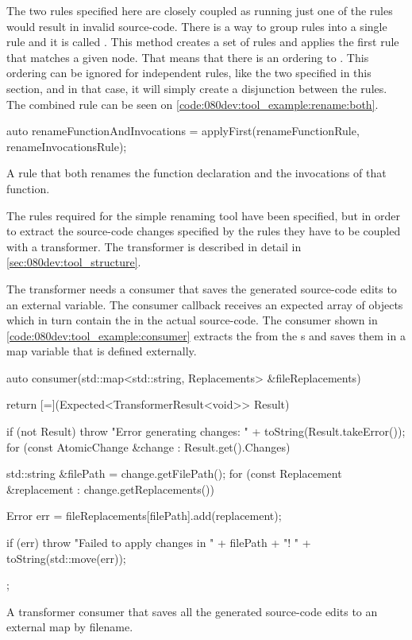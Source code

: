 The two rules specified here are closely coupled as running just one of the rules would result in invalid source-code. There is a way to group rules into a single rule and it is called . This method creates a set of rules and applies the first rule that matches a given node. That means that there is an ordering to . This ordering can be ignored for independent rules, like the two specified in this section, and in that case, it will simply create a disjunction between the rules. The combined rule can be seen on \cref{code:080dev:tool_example:rename:both}.

\begin{listing}[H]
    \begin{cppcode}
auto renameFunctionAndInvocations = applyFirst({renameFunctionRule, renameInvocationsRule});
    \end{cppcode}
    \caption{A rule that both renames the function declaration and the invocations of that function.}
    \label{code:080dev:tool_example:rename:both}
\end{listing}

The rules required for the simple renaming tool have been specified, but in order to extract the source-code changes specified by the rules they have to be coupled with a transformer. The transformer is described in detail in \cref{sec:080dev:tool_structure}.

The transformer needs a consumer that saves the generated source-code edits to an external variable. The consumer callback receives an expected array of  objects which in turn contain the  in the actual source-code. The consumer shown in \cref{code:080dev:tool_example:consumer} extracts the  from the s and saves them in a map variable that is defined externally.

\begin{listing}[H]
    \begin{cppcode}
auto consumer(std::map<std::string, Replacements> &fileReplacements) {
    return [=](Expected<TransformerResult<void>> Result) {
        if (not Result) {
            throw "Error generating changes: " + toString(Result.takeError());
        }
        for (const AtomicChange &change : Result.get().Changes) {
            std::string &filePath = change.getFilePath();
            for (const Replacement &replacement : change.getReplacements()) {
                Error err = fileReplacements[filePath].add(replacement);

                if (err) {
                    throw "Failed to apply changes in " + filePath + "! " + toString(std::move(err));
                }
            }
        }
    };
}
    \end{cppcode}
    \caption{A transformer consumer that saves all the generated source-code edits to an external map by filename.}
    \label{code:080dev:tool_example:consumer}
\end{listing}

